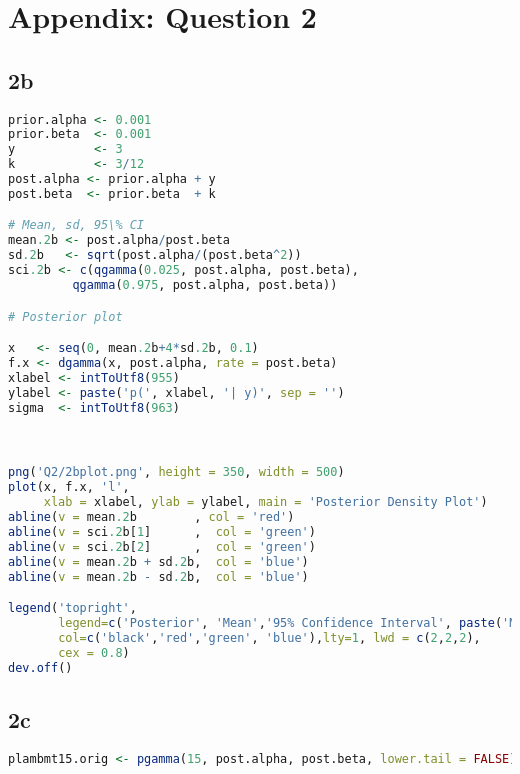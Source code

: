 \documentclass{article}
\begin{document}
\section{Appendix: Question 2} \label{appA2}
\subsection{2b} \label{appA2b}
\begin{lstlisting}[language=R]
prior.alpha <- 0.001
prior.beta  <- 0.001
y           <- 3
k           <- 3/12
post.alpha <- prior.alpha + y
post.beta  <- prior.beta  + k

# Mean, sd, 95\% CI
mean.2b <- post.alpha/post.beta
sd.2b   <- sqrt(post.alpha/(post.beta^2))
sci.2b <- c(qgamma(0.025, post.alpha, post.beta), 
         qgamma(0.975, post.alpha, post.beta))

# Posterior plot

x   <- seq(0, mean.2b+4*sd.2b, 0.1)
f.x <- dgamma(x, post.alpha, rate = post.beta)
xlabel <- intToUtf8(955)
ylabel <- paste('p(', xlabel, '| y)', sep = '')
sigma  <- intToUtf8(963)



png('Q2/2bplot.png', height = 350, width = 500)
plot(x, f.x, 'l', 
     xlab = xlabel, ylab = ylabel, main = 'Posterior Density Plot')
abline(v = mean.2b        , col = 'red')
abline(v = sci.2b[1]      ,  col = 'green')
abline(v = sci.2b[2]      ,  col = 'green')
abline(v = mean.2b + sd.2b,  col = 'blue')
abline(v = mean.2b - sd.2b,  col = 'blue')

legend('topright',
       legend=c('Posterior', 'Mean','95% Confidence Interval', paste('Mean +-', sigma)),
       col=c('black','red','green', 'blue'),lty=1, lwd = c(2,2,2),
       cex = 0.8)
dev.off()
\end{lstlisting}
\subsection{2c} \label{appA2c}
\begin{lstlisting}[language=R]
plambmt15.orig <- pgamma(15, post.alpha, post.beta, lower.tail = FALSE)
\end{lstlisting}
\end{document}
